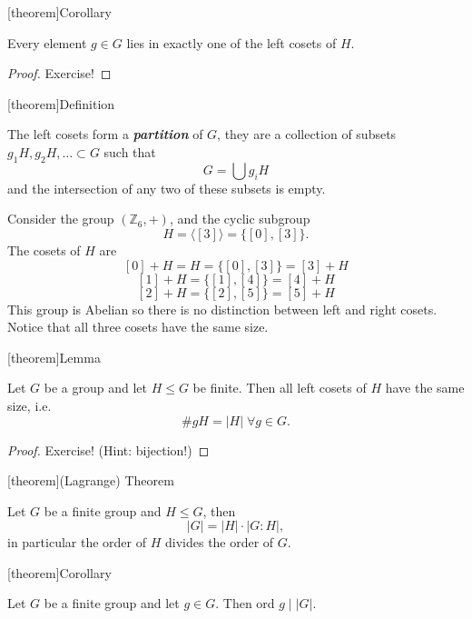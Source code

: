 \documentclass[12pt]{report}
\theoremstyle{definition}
\begin{document}
[theorem]{Corollary}
\begin{g in one of the left coset of H}
    Every element $g \in G$ lies in exactly one of the left cosets of $H$.
\end{g in one of the left coset of H}

\begin{proof}
    Exercise!
\end{proof}

[theorem]{Definition}
\begin{partition of G}
    The left cosets form a \textbf{\emph{partition}} of $G$, they are a collection of subsets
    $g_1H, g_2H,\ldots \subset G$ such that \[
        G = \bigcup g_i H
    \]and the intersection of any two of these subsets is empty.
\end{partition of G}

\begin{ex}
    Consider the group $(\mathbb{Z}_6, +)$, and the cyclic subgroup\[
        H = \langle [3] \rangle = \{[0],[3]\}.
    \]The cosets of $H$ are \[
    [0] + H = H = \{[0],[3]\} = [3] + H
    \]\[
    [1] + H = \{[1],[4]\} = [4] + H
    \]\[
    [2] + H = \{[2],[5]\} = [5] + H
    \]
    This group is Abelian so there is no distinction between left and right cosets.
    Notice that all three cosets have the same size.
\end{ex}

[theorem]{Lemma}
\begin{size of left coset}
    Let $G$ be a group and let $H \le G$ be finite.
    Then all left cosets of $H$ have the same size, i.e.\ \[
        \#gH = |H| \;\forall g \in G.
    \]
\end{size of left coset}

\begin{proof}
    Exercise! (Hint: bijection!)
\end{proof}

[theorem]{(Lagrange) Theorem}
\begin{Lagrange Theorem}
    Let $G$ be a finite group and $H \le G$, then\[
    |G| = |H| \cdot |G:H|,
    \]
    in particular the order of $H$ divides the order of $G$.
\end{Lagrange Theorem}

[theorem]{Corollary}
\begin{order of g divides order of G}
    Let $G$ be a finite group and let $g \in G$. Then ord $g \; | \; |G| $.
\end{order of g divides order of G}
\end{document}
